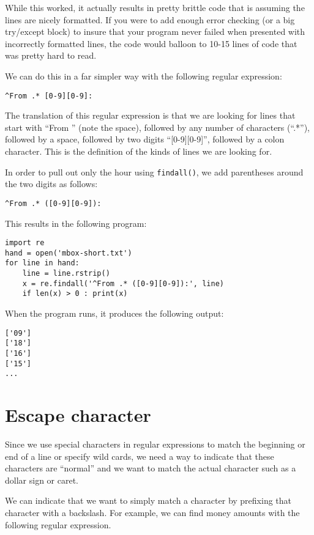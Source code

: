While this worked, it actually results in pretty brittle code that is assuming the lines are nicely
formatted.  If you were to add enough error checking (or a big try/except block) to insure that your
program never failed when presented with incorrectly formatted lines, the code would balloon to 
10-15 lines of code that was pretty hard to read.

We can do this in a far simpler way with the following regular expression:

\beforeverb
\begin{verbatim}
^From .* [0-9][0-9]:
\end{verbatim}
\afterverb
%
The translation of this regular expression is that we are looking for lines that start with ``From ''
(note the space), followed by any number of characters (``.*''), followed by a space, followed by two
digits ``[0-9][0-9]'', followed by a colon character.  This is the definition of the kinds of lines
we are looking for.  

In order to pull out only the hour using {\tt findall()}, we add parentheses around the two digits
as follows:

\beforeverb
\begin{verbatim}
^From .* ([0-9][0-9]):
\end{verbatim}
\afterverb
%
This results in the following program:

\beforeverb
\begin{verbatim}
import re
hand = open('mbox-short.txt')
for line in hand:
    line = line.rstrip()
    x = re.findall('^From .* ([0-9][0-9]):', line)
    if len(x) > 0 : print(x)
\end{verbatim}
\afterverb
%
When the program runs, it produces the following output:

\beforeverb
\begin{verbatim}
['09']
['18']
['16']
['15']
...
\end{verbatim}
\afterverb
%
\section{Escape character}

Since we use special characters in regular expressions to match the beginning or end of 
a line or specify wild cards, we need a way to indicate that these characters are ``normal'' 
and we want to match the actual character such as a dollar sign or caret.

We can indicate that we want to simply match a character by prefixing that character 
with a backslash.  For example, we can find money amounts with the following regular
expression.

